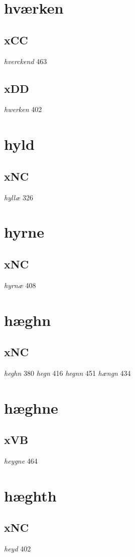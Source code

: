 \documentclass[a4paper,twocolumn]{article}
\begin{document}
\section{hværken}
\label{sec:orge18b932}
\subsection{xCC}
\label{sec:org587355d}
\emph{hverckend} 463 
\subsection{xDD}
\label{sec:org61ea90f}
\emph{hwerken} 402 
\section{hyld}
\label{sec:org2a78895}
\subsection{xNC}
\label{sec:orgf642250}
\emph{hyllæ} 326 
\section{hyrne}
\label{sec:org67a3d8d}
\subsection{xNC}
\label{sec:org4afed56}
\emph{hyrnæ} 408 
\section{hæghn}
\label{sec:orgddfbda1}
\subsection{xNC}
\label{sec:org70f8ae8}
\emph{heghn} 380 \emph{hegn} 416 \emph{hegnn} 451 \emph{hængn} 434 
\section{hæghne}
\label{sec:orgace71c0}
\subsection{xVB}
\label{sec:org572206c}
\emph{heygne} 464 
\section{hæghth}
\label{sec:org3418588}
\subsection{xNC}
\label{sec:org227d0b3}
\emph{heyd} 402 
\end{document}
